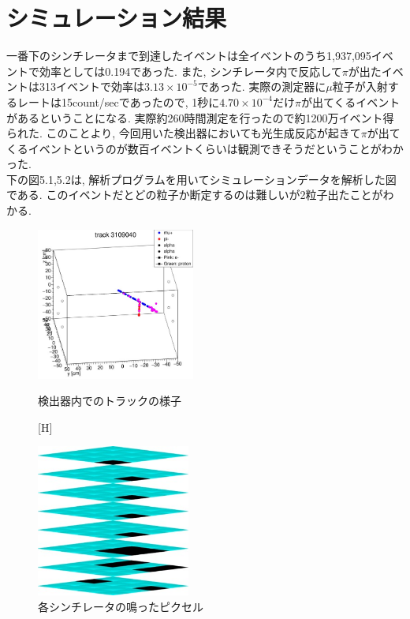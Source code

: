 \section{シミュレーション結果}
一番下のシンチレータまで到達したイベントは全イベントのうち1,937,095イベントで効率としては0.194であった.
また, シンチレータ内で反応して$\pi$が出たイベントは313イベントで効率は$3.13 \times10^{-5}$であった.
実際の測定器に$\mu$粒子が入射するレートは15count/secであったので, 1秒に$4.70 \times10^{-4}$だけ$\pi$が出てくるイベントがあるということになる.
実際約260時間測定を行ったので約1200万イベント得られた.
このことより, 今回用いた検出器においても光生成反応が起きて$\pi$が出てくるイベントというのが数百イベントくらいは観測できそうだということがわかった.
\\
下の図5.1,5.2は, 解析プログラムを用いてシミュレーションデータを解析した図である.
このイベントだとどの粒子か断定するのは難しいが2粒子出たことがわかる.
\begin{figure}[H]
    \begin{minipage}[b]{0.47\linewidth}
        \centering
        \includegraphics[height=5cm]{img/track_pion.jpg}
        \caption{検出器内でのトラックの様子}
    \end{minipage}[H]
    \begin{minipage}[b]{0.47\linewidth}
        \centering
        \includegraphics[height=5cm]{img/track_simulation.jpg}
        \caption{各シンチレータの鳴ったピクセル}
    \end{minipage}
\end{figure}
        
